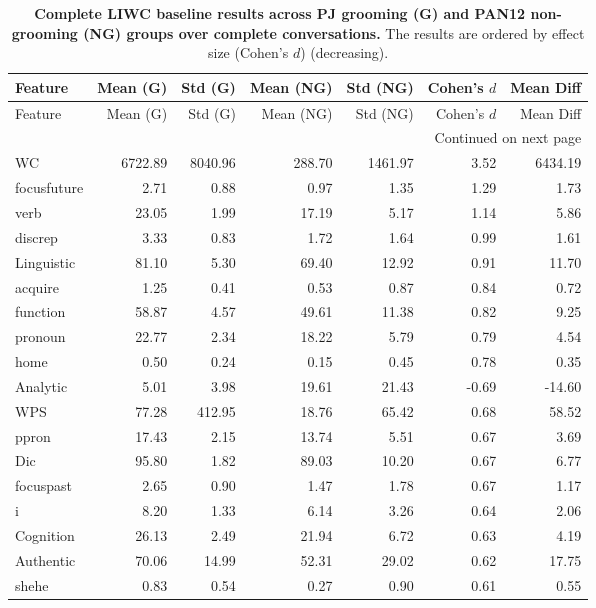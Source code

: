 
\begingroup
\scriptsize %
\setlength{\LTcapwidth}{\textwidth}
\setlength\LTleft{\fill}
\setlength\LTright{\fill}
\begin{longtable}{@{}p{3.4cm}rrrrrr@{}}
\caption[Complete LIWC baseline results]{\textbf{Complete LIWC baseline results across PJ grooming (G) and PAN12 non-grooming (NG) groups over complete conversations.} The results are ordered by effect size (Cohen's $d$) \cite{cohen1988} (decreasing).}\\
\toprule
Feature & Mean (G) & Std (G) & Mean (NG) & Std (NG) & Cohen's $d$ & Mean Diff \\
\midrule
\endfirsthead
\toprule
Feature & Mean (G) & Std (G) & Mean (NG) & Std (NG) & Cohen's $d$ & Mean Diff \\
\midrule
\endhead
\midrule
\multicolumn{7}{r}{{Continued on next page}} \\
\bottomrule
\endfoot
\bottomrule
\endlastfoot
WC & 6722.89 & 8040.96 & 288.70 & 1461.97 & 3.52 & 6434.19 \\
focusfuture & 2.71 & 0.88 & 0.97 & 1.35 & 1.29 & 1.73 \\
verb & 23.05 & 1.99 & 17.19 & 5.17 & 1.14 & 5.86 \\
discrep & 3.33 & 0.83 & 1.72 & 1.64 & 0.99 & 1.61 \\
Linguistic & 81.10 & 5.30 & 69.40 & 12.92 & 0.91 & 11.70 \\
acquire & 1.25 & 0.41 & 0.53 & 0.87 & 0.84 & 0.72 \\
function & 58.87 & 4.57 & 49.61 & 11.38 & 0.82 & 9.25 \\
pronoun & 22.77 & 2.34 & 18.22 & 5.79 & 0.79 & 4.54 \\
home & 0.50 & 0.24 & 0.15 & 0.45 & 0.78 & 0.35 \\
Analytic & 5.01 & 3.98 & 19.61 & 21.43 & -0.69 & -14.60 \\
WPS & 77.28 & 412.95 & 18.76 & 65.42 & 0.68 & 58.52 \\
ppron & 17.43 & 2.15 & 13.74 & 5.51 & 0.67 & 3.69 \\
Dic & 95.80 & 1.82 & 89.03 & 10.20 & 0.67 & 6.77 \\
focuspast & 2.65 & 0.90 & 1.47 & 1.78 & 0.67 & 1.17 \\
i & 8.20 & 1.33 & 6.14 & 3.26 & 0.64 & 2.06 \\
Cognition & 26.13 & 2.49 & 21.94 & 6.72 & 0.63 & 4.19 \\
Authentic & 70.06 & 14.99 & 52.31 & 29.02 & 0.62 & 17.75 \\
shehe & 0.83 & 0.54 & 0.27 & 0.90 & 0.61 & 0.55 \\

\end{longtable}
